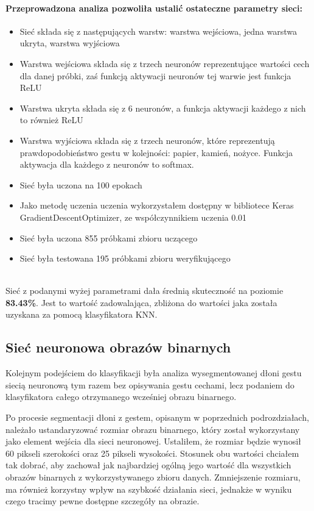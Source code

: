 \documentclass[a4paper,12pt,twoside,openany]{report}
\begin{document}
	\paragraph{Przeprowadzona analiza pozwoliła ustalić ostateczne parametry sieci:}
	\begin{itemize}
		\item Sieć składa się z następujących warstw: warstwa wejściowa, jedna warstwa ukryta, warstwa wyjściowa
		\item Warstwa wejściowa składa się z trzech neuronów reprezentujące wartości cech dla danej próbki, zaś funkcją aktywacji neuronów tej warwie jest funkcja ReLU
		\item Warstwa ukryta składa się z 6 neuronów, a funkcja aktywacji każdego z nich to również ReLU
		\item Warstwa wyjściowa składa się z trzech neuronów, które reprezentują prawdopodobieństwo gestu w kolejności: papier, kamień, nożyce. Funkcja aktywacja dla każdego z neuronów to softmax.
		\item Sieć była uczona na 100 epokach
		\item Jako metodę uczenia uczenia wykorzystałem dostępny w bibliotece Keras GradientDescentOptimizer, ze współczynnikiem uczenia 0.01
		\item Sieć była uczona 855 próbkami zbioru uczącego
		\item Sieć była testowana 195 próbkami zbioru weryfikującego
	\end{itemize}
	\mbox{}
	\\
	Sieć z podanymi wyżej parametrami dała średnią skuteczność na poziomie \textbf{83.43\%}. Jest to wartość zadowalająca, zbliżona do wartości jaka została uzyskana za pomocą klasyfikatora KNN.
\subsection{Sieć neuronowa obrazów binarnych}


	Kolejnym podejściem do klasyfikacji była analiza wysegmentowanej dłoni gestu siecią neuronową tym razem bez opisywania gestu cechami, lecz podaniem do klasyfikatora całego otrzymanego wcześniej obrazu binarnego.
	
	Po procesie segmentacji dłoni z gestem, opisanym w poprzednich podrozdziałach, należało ustandaryzować rozmiar obrazu binarnego, który został wykorzystany jako element wejścia dla sieci neuronowej. Ustaliłem, że rozmiar będzie wynosił 60 pikseli szerokości oraz 25 pikseli wysokości. Stosunek obu wartości chciałem tak dobrać, aby zachował jak najbardziej ogólną jego wartość dla wszystkich obrazów binarnych z wykorzystywanego zbioru danych. Zmniejszenie rozmiaru, ma również korzystny wpływ na szybkość działania sieci, jednakże w wyniku czego tracimy pewne dostępne szczegóły na obrazie.
\end{document}
